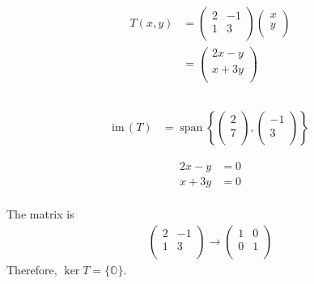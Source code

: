 \documentclass[fleqn, a4paper, twocolumn, draft]{article}
\DeclareMathOperator{\vspan}{\mathrm{span}} %
\theoremstyle{definition}
\theoremstyle{theorem}
\theoremstyle{remark}
\newcommand{\im}{\mathrm{im}\,}
\numberwithin{corollary}{theorem}
\numberwithin{equation}{theorem}
\begin{document}
\subsection{}

\begin{align*}
	T(x, y) &= 
		\begin{pmatrix}
			2 & -1\\
			1 & 3\\
		\end{pmatrix}
		\begin{pmatrix}
			x\\
			y\\
		\end{pmatrix}\\
	&=
	\begin{pmatrix}
		2x - y\\
		x + 3y\\
	\end{pmatrix}
\end{align*}

\subsection{}

\begin{align*}
	\im (T) &= \vspan 
	\left\lbrace
		\begin{pmatrix}
			2\\
			7\\
		\end{pmatrix}
		,
		\begin{pmatrix}
			-1\\
			3\\
		\end{pmatrix}
	\right\rbrace
\end{align*}

\begin{align*}
	2x - y &= 0\\
	x + 3y &= 0\\
\end{align*}

The matrix is
\begin{align*}
	\begin{pmatrix}
		2 & -1\\
		1 & 3\\
	\end{pmatrix}
	\to
	\begin{pmatrix}
		 1 & 0\\
		 0 & 1\\
	\end{pmatrix}
\end{align*}
Therefore, $\ker T = \{\mathbb{O}\}$.
\end{document}
